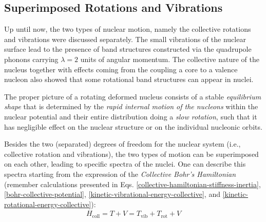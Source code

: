 \subsection{Superimposed Rotations and Vibrations}

Up until now, the two types of nuclear motion, namely the collective rotations and vibrations were discussed separately. The small vibrations of the nuclear surface lead to the presence of band structures constructed via the quadrupole phonons carrying $\lambda=2$ units of angular momentum. The collective nature of the nucleus together with effects coming from the coupling a core to a valence nucleon also showed that some rotational band structures can appear in nuclei.

The proper picture of a rotating deformed nucleus consists of a stable \emph{equilibrium shape} that is determined by the \emph{rapid internal motion of the nucleons} within the nuclear potential and their entire distribution doing a \emph{slow rotation}, such that it has negligible effect on the nuclear structure or on the individual nucleonic orbits.

Besides the two (separated) degrees of freedom for the nuclear system (i.e., collective rotation and vibrations), the two types of motion can be superimposed on each other, leading to specific spectra of the nuclei. One can describe this spectra starting from the expression of the \emph{Collective Bohr's Hamiltonian} (remember calculations presented in Eqs. \ref{collective-hamiltonian-stiffness-inertia}, \ref{bohr-collective-potential}, \ref{kinetic-vibrational-energy-collective}, and \ref{kinetic-rotational-energy-collective}):
\begin{align}
    H_\text{coll}=T+V=T_\text{vib}+T_\text{rot}+V
\end{align}

